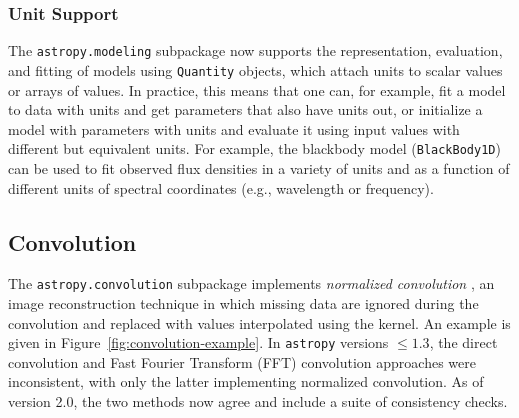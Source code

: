 \documentclass[modern]{aastex61}
\newcommand{\package}[1]{\texttt{#1}\xspace}
\newcommand{\astropypkg}{\package{astropy}}
\renewcommand{\figurename}{Figure\xspace}
\begin{document}
\subsubsection{Unit Support}

The \package{astropy.modeling} subpackage now supports the representation,
evaluation, and fitting of models using \texttt{Quantity} objects, which attach
units to scalar values or arrays of values. In practice, this means that one
can, for example, fit a model to data with units and get parameters that also
have units out, or initialize a model with parameters with units and evaluate
it using input values with different but equivalent units. For example, the
blackbody model (\texttt{BlackBody1D}) can be used to fit observed flux
densities in a variety of units and as a function of different units of
spectral coordinates (e.g., wavelength or frequency).

\subsection{Convolution}

The \package{astropy.convolution} subpackage implements
\textit{normalized convolution} \citep[e.g.,][]{Knutsson1993}, an image
reconstruction technique in which missing data are ignored during the
convolution and replaced with values interpolated using the kernel.
An example is given in \figurename~\ref{fig:convolution-example}.
In \astropypkg versions $\leq 1.3$, the direct convolution and Fast Fourier Transform (FFT)
convolution approaches were inconsistent, with only the latter implementing
normalized convolution.
As of version 2.0, the two methods now agree and include a suite of
consistency checks.
\end{document}
